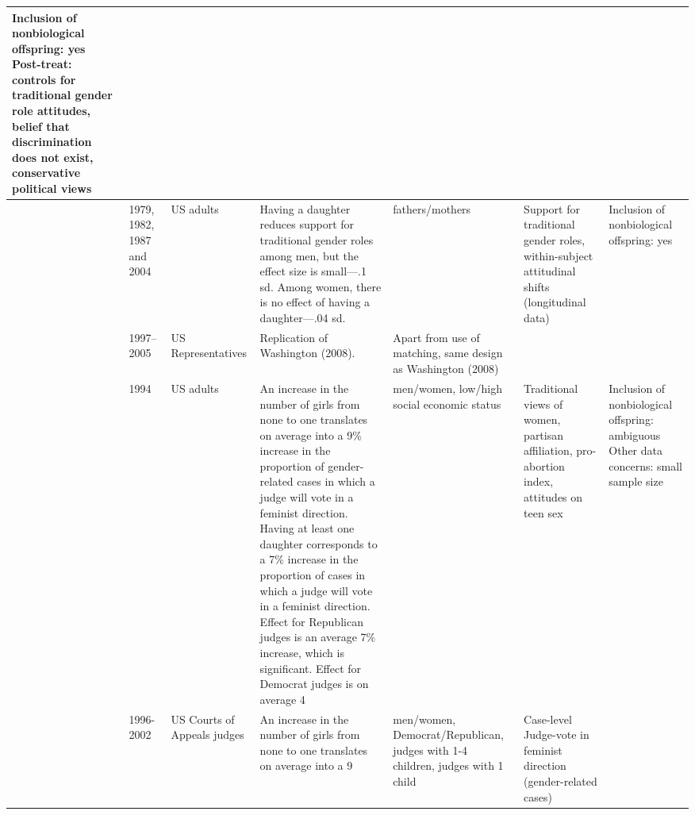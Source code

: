 \begin{longtable}{p{}p{}p{}p{}p{}p{}p{}}
Inclusion of nonbiological offspring: yes
Post-treat: controls for traditional gender role attitudes, belief that discrimination does not exist, conservative political views \\ 
   \midrule
\cite{shafer2011effect} & 1979, 1982, 1987 and 2004 & US adults & Having a daughter reduces support for traditional gender roles among men, but the effect size is small---.1 sd. Among women, there is no effect of having a daughter---.04 sd.
 & fathers/mothers & Support for traditional gender roles, within-subject attitudinal shifts (longitudinal data) & Inclusion of nonbiological offspring: yes \\ 
   \midrule
\cite{iacus2011multivariate} & 1997--2005 & US Representatives & Replication of Washington (2008). & Apart from use of matching, same design as Washington (2008) &  &  \\ 
   \midrule
\cite{conley2013effect} & 1994 & US adults & An increase in the number of girls from none to one translates on average into a 9\% increase in the proportion of gender-related cases in which a judge will vote in a feminist direction. Having at least one daughter corresponds to a 7\% increase in the proportion of cases in which a judge will vote in a feminist direction. Effect for Republican judges is an average 7\% increase, which is significant. Effect for Democrat judges is on average 4%
 & men/women, low/high social economic status & Traditional views of women, partisan affiliation, pro-abortion index, attitudes on teen sex & Inclusion of nonbiological offspring: ambiguous
Other data concerns: small sample size \\ 
   \midrule
\cite{glynn2015identifying} & 1996-2002 & US Courts of Appeals judges & An increase in the number of girls from none to one translates on average into a 9%
 & men/women, Democrat/Republican, judges with 1-4 children, judges with 1 child & Case-level Judge-vote in feminist direction (gender-related cases)

\end{longtable}
